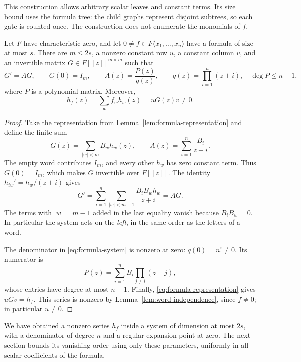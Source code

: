 This construction allows arbitrary scalar leaves and constant terms.
Its size bound uses the formula tree: the child graphs represent
disjoint subtrees, so each gate is counted once.  The construction does
not enumerate the monomials of $f$.

\begin{proposition}
\label{prop:formula-system}
Let $F$ have characteristic zero, and let
$0\ne f\in F\langle x_1,\ldots,x_n\rangle$ have a formula of size at
most $s$.  There are $m\le2s$, a nonzero constant row $u$, a constant
column $v$, and an invertible matrix $G\in F[[z]]^{m\times m}$ such that
\begin{equation}
\label{eq:formula-system}
 G'=AG,\qquad G(0)=I_m,\qquad
 A(z)=\frac{P(z)}{q(z)},\qquad
 q(z)=\prod_{i=1}^n(z+i),\quad \deg P\le n-1,
\end{equation}
where $P$ is a polynomial matrix.  Moreover,
\begin{equation}
\label{eq:formula-output}
 h_f(z)=\sum_w f_wh_w(z)=uG(z)v\ne0.
\end{equation}
\end{proposition}

\begin{proof}
Take the representation from Lemma~\ref{lem:formula-representation}
and define the finite sum
\[
 G(z)=\sum_{|w|<m}B_wh_w(z),\qquad
 A(z)=\sum_{i=1}^n\frac{B_i}{z+i}.
\]
The empty word contributes $I_m$, and every other $h_w$ has zero
constant term.  Thus $G(0)=I_m$, which makes $G$ invertible over
$F[[z]]$.  The identity $h_{iw}'=h_w/(z+i)$ gives
\[
 G'
 =\sum_{i=1}^n\sum_{|w|<m-1}
       \frac{B_iB_wh_w}{z+i}
 =AG.
\]
The terms with $|w|=m-1$ added in the last equality vanish because
$B_iB_w=0$.  In particular the system acts on the \emph{left}, in
the same order as the letters of a word.

The denominator in \eqref{eq:formula-system} is nonzero at zero:
$q(0)=n!\ne0$.  Its numerator is
\[
 P(z)=\sum_{i=1}^n B_i\prod_{j\ne i}(z+j),
\]
whose entries have degree at most $n-1$.  Finally,
\eqref{eq:formula-representation} gives $uGv=h_f$.
This series is nonzero by Lemma~\ref{lem:word-independence}, since
$f\ne0$; in particular $u\ne0$.
\end{proof}

We have obtained a nonzero series $h_f$ inside a system of dimension at
most $2s$, with a denominator of degree $n$ and a regular expansion
point at zero.  The next section bounds its vanishing order using only
these parameters, uniformly in all scalar coefficients of the formula.
